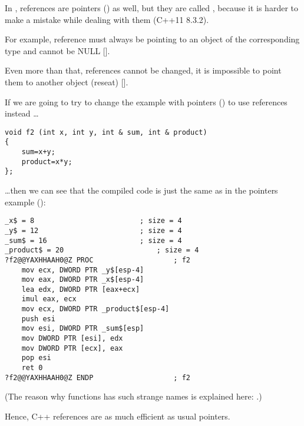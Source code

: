 \label{cpp_references}

In \Cpp, references are pointers () as well, but they are called , because it is harder to make a mistake while
dealing with them (C++11 8.3.2). %

For example, reference must always be pointing to an object of the corresponding type and cannot be NULL
[].

Even more than that, references cannot be changed, it is impossible to point them to another object (reseat)
[].

If we are going to try to change the example with pointers () 
to use references instead \dots

\begin{lstlisting}
void f2 (int x, int y, int & sum, int & product)
{
	sum=x+y;
	product=x*y;
};
\end{lstlisting}

\dots then we can see that the compiled code is just the same 
as in the pointers example ():

\begin{lstlisting}[caption=\Optimizing MSVC 2010]
_x$ = 8							; size = 4
_y$ = 12						; size = 4
_sum$ = 16						; size = 4
_product$ = 20						; size = 4
?f2@@YAXHHAAH0@Z PROC					; f2
	mov	ecx, DWORD PTR _y$[esp-4]
	mov	eax, DWORD PTR _x$[esp-4]
	lea	edx, DWORD PTR [eax+ecx]
	imul eax, ecx
	mov ecx, DWORD PTR _product$[esp-4]
	push esi
	mov	esi, DWORD PTR _sum$[esp]
	mov	DWORD PTR [esi], edx
	mov	DWORD PTR [ecx], eax
	pop	esi
	ret	0
?f2@@YAXHHAAH0@Z ENDP					; f2
\end{lstlisting}

(The reason why \Cpp functions has such strange names is explained here: .)

Hence, C++ references are as much efficient as usual pointers.
